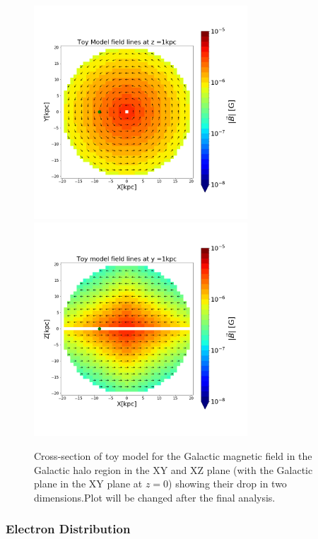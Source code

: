 \documentclass[12pt, a4 paper]{article}
\newcommand{\Vasu}[1]{{\color{purple}#1}}
\begin{document}
\begin{figure}[h!]
    \centering
    \includegraphics[width = 8cm]{Images/toymodel_XY_6Sep.png}%
    \includegraphics[width = 8cm]{Images/toymodel_XZ_6Sep.png}
    \caption{Cross-section of toy model for the Galactic magnetic field in the Galactic halo region in the XY and XZ plane (with the Galactic plane in the XY plane at $z=0$) showing their drop in two dimensions.\Vasu{Plot will be changed after the final analysis.} }
    \label{fig:Vis_TM}
\end{figure}
\clearpage

\subsubsection{Electron Distribution}
\end{document}
